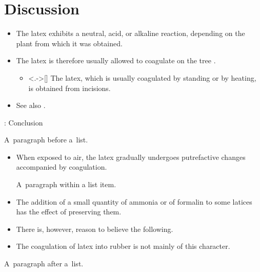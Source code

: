 \section{Discussion}


\begin{frame}{\titleprefix}

	\begin{itemize}[<+->]
		\item The latex exhibits a neutral, acid, or alkaline reaction, depending on the plant from which it was obtained.
		\item The latex is therefore usually allowed to coagulate on the tree \citep{Koszegi2013}.
			\begin{itemize}
				\item<.->[\raisebox{0.75pt}{\scalebox{0.86}{$\Rightarrow$}}\!] The latex, which is usually coagulated by standing or by heating, is obtained from incisions.
			\end{itemize}
		\item See also \cite{Bordalo2013, Dohmen2012}.
	\end{itemize}	

\end{frame}


\begin{frame}{\titleprefix: Conclusion}

	A~paragraph before a~list.

	\begin{itemize}
		\item When exposed to air, the latex gradually undergoes putrefactive changes accompanied by coagulation. \par
		A~paragraph within a list item.
		\item The addition of a small quantity of ammonia or of formalin to some latices has the effect of preserving them.
		\item There is, however, reason to believe the following.
		\item The coagulation of latex into rubber is not mainly of this character.
	\end{itemize}

	A~paragraph after a~list.

\end{frame}


